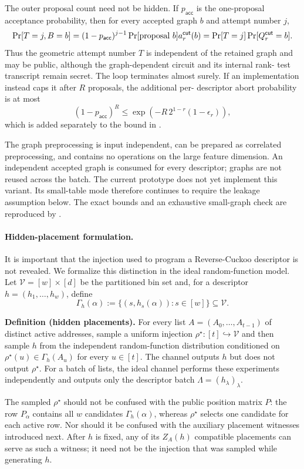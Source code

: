 The outer proposal count need not be hidden.  If $p_{\mathsf{acc}}$ is the
one-proposal acceptance probability, then for every accepted graph $b$ and
attempt number $j$,
\[
 \Pr[T=j,B=b]
 =(1-p_{\mathsf{acc}})^{j-1}\Pr[\textnormal{proposal }b]a_r^{\mathsf{cut}}(b)
 =\Pr[T=j]\Pr[Q_r^{\mathsf{cut}}=b].
\]
Thus the geometric attempt number $T$ is independent of the retained graph
and may be public, although the graph-dependent circuit and its internal rank-
test transcript remain secret.  The loop terminates almost surely.  If an
implementation instead caps it after $R$ proposals, the additional per-
descriptor abort probability is at most
\[
 (1-p_{\mathsf{acc}})^R
 \leq \exp\left(-R\,2^{1-r}(1-\epsilon_r)\right),
\]
which is added separately to the bound in
.

The graph preprocessing is input independent, can be prepared as correlated
preprocessing, and contains no operations on the large feature dimension.  An
independent accepted graph is consumed for every descriptor; graphs are not
reused across the batch.  The current
prototype does not yet implement this variant.  Its small-table mode therefore
continues to require the leakage assumption below.  The exact bounds and an
exhaustive small-graph check are reproduced by
.

\paragraph{Hidden-placement formulation.}
It is important that the injection used to program a Reverse-Cuckoo
descriptor is not revealed.  We formalize this distinction in the ideal
random-function model.  Let $\mathcal V=[w]\times[d]$ be the partitioned bin
set and, for a descriptor $h=(h_1,\ldots,h_w)$, define
\[
 \Gamma_h(\alpha):=\{(s,h_s(\alpha)):s\in[w]\}\subseteq\mathcal V.
\]

\medskip
\noindent\textbf{Definition (hidden placements).}
For every list $A=(A_0,\ldots,A_{t-1})$ of distinct active addresses, sample a uniform injection
$\rho^\star:[t]\hookrightarrow\mathcal V$ and then sample $h$ from the
independent random-function distribution conditioned on
$\rho^\star(u)\in\Gamma_h(A_u)$ for every $u\in[t]$.  The channel outputs $h$
but does not output $\rho^\star$.  For a batch of lists, the ideal channel
performs these experiments independently and outputs only the descriptor
batch $\Lambda=(h_\lambda)_\lambda$.

The sampled $\rho^\star$ should not be confused with the public position
matrix $P$: the row $P_\alpha$ contains all $w$ candidates
$\Gamma_h(\alpha)$, whereas $\rho^\star$ selects one candidate for each
active row.  Nor should it be confused with the auxiliary placement witnesses
introduced next.  After $h$ is fixed, any of its $Z_A(h)$ compatible
placements can serve as such a witness; it need not be the injection that was
sampled while generating $h$.

